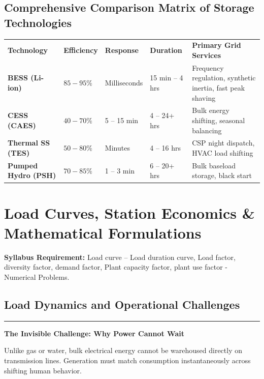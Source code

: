 \documentclass[11pt,a4paper]{article}
\newcommand{\concept}[1]{%
  \vspace{3pt}\noindent\textcolor{AnthGreen}{\rule{3.5pt}{10pt}}\enspace
  \textbf{\sffamily\color{AnthDark}#1}\par\vspace{2pt}%
}
\newcommand{\syllabusitem}[1]{%
  \begin{tcolorbox}[enhanced, colback=AnthOrange!8, colframe=AnthOrange, boxrule=0.4pt, arc=3pt, left=7pt, right=7pt, top=3pt, bottom=3pt]
    \small\sffamily\textbf{\color{AnthOrange}Syllabus Requirement:} #1
  \end{tcolorbox}
}
\begin{document}
\subsection{Comprehensive Comparison Matrix of Storage Technologies}

\begin{center}
\small
\begin{tabularx}{\textwidth}{L{2.5cm} C{2.0cm} C{2.0cm} C{2.2cm} X}
  \color{white}\textbf{Technology} & \color{white}\textbf{Efficiency} & \color{white}\textbf{Response} & \color{white}\textbf{Duration} & \color{white}\textbf{Primary Grid Services} \\
   \textbf{BESS (Li-ion)} & $85-95\%$ & Milliseconds & 15 min -- 4 hrs & Frequency regulation, synthetic inertia, fast peak shaving \\
  \textbf{CESS (CAES)} & $40-70\%$ & 5 -- 15 min & 4 -- 24+ hrs & Bulk energy shifting, seasonal balancing \\
   \textbf{Thermal SS (TES)} & $50-80\%$ & Minutes & 4 -- 16 hrs & CSP night dispatch, HVAC load shifting \\
  \textbf{Pumped Hydro (PSH)} & $70-85\%$ & 1 -- 3 min & 6 -- 20+ hrs & Bulk baseload storage, black start \\
\end{tabularx}
\end{center}

\clearpage
\section{Load Curves, Station Economics \& Mathematical Formulations}

\syllabusitem{Load curve -- Load duration curve, Load factor, diversity factor, demand factor, Plant capacity factor, plant use factor - Numerical Problems.}

\subsection{Load Dynamics and Operational Challenges}

\concept{The Invisible Challenge: Why Power Cannot Wait}
Unlike gas or water, bulk electrical energy cannot be warehoused directly on transmission lines. Generation must match consumption instantaneously across shifting human behavior.
\end{document}
